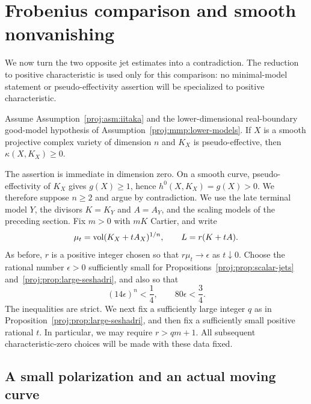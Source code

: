 \section{Frobenius comparison and smooth nonvanishing}
\label{proj:fr:section}

We now turn the two opposite jet estimates into a contradiction.
The reduction to positive characteristic is used only for this comparison:
no minimal-model statement or pseudo-effectivity assertion will be
specialized to positive characteristic.

\begin{theorem}
\label{proj:thm:smooth-nonvanishing}
Assume Assumption~\ref{proj:asm:iitaka} and the lower-dimensional
real-boundary good-model hypothesis of Assumption~\ref{proj:mmp:lower-models}.
If \(X\) is a smooth projective complex variety of dimension \(n\) and
\(K_X\) is pseudo-effective, then \(\kappa(X,K_X)\geq0\).
\end{theorem}

The assertion is immediate in dimension zero. On a smooth curve,
pseudo-effectivity of \(K_X\) gives \(g(X)\geq1\), hence
\(h^0(X,K_X)=g(X)>0\). We therefore suppose \(n\geq2\) and argue by
contradiction. We use the late terminal model \(Y\), the divisors
\(K=K_Y\) and \(A=A_Y\), and the scaling models of the preceding
section. Fix \(m>0\) with \(mK\) Cartier, and write
\[
 \mu_t=\operatorname{vol}(K_X+tA_X)^{1/n},\qquad
 L=r(K+tA).
\]
As before, \(r\) is a positive integer chosen so that
\(r\mu_t\longrightarrow\epsilon\) as \(t\downarrow0\).
Choose the rational number \(\epsilon>0\) sufficiently small for
Propositions~\ref{proj:prop:scalar-jets} and~\ref{proj:prop:large-seshadri}, and also
so that
\begin{equation}
\label{proj:fr:epsilon}
 (14\epsilon)^n<\frac14,\qquad
 80\epsilon<\frac34.
\end{equation}
The inequalities are strict. We next fix a sufficiently large integer
\(q\) as in Proposition~\ref{proj:prop:large-seshadri}, and then fix a
sufficiently small positive rational \(t\). In particular, we may require
\(r>qm+1\). All subsequent characteristic-zero choices will be made with
these data fixed.

\subsection{A small polarization and an actual moving curve}

